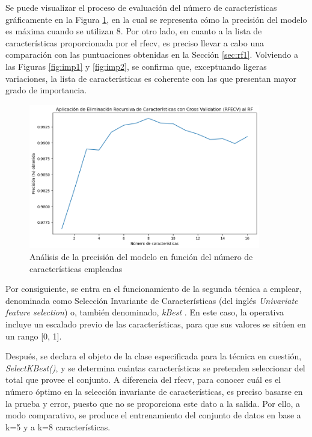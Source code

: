 \vspace{3mm}

Se puede visualizar el proceso de evaluación del número de características gráficamente en la Figura \ref{fig:rfecv}, en la cual se representa cómo la precisión del modelo es máxima cuando se utilizan 8. Por otro lado, en cuanto a la lista de características proporcionada por el \gls{rfecv}, es preciso llevar a cabo una comparación con las puntuaciones obtenidas en la Sección \ref{sec:rf1}. Volviendo a las Figuras \ref{fig:imp1} y \ref{fig:imp2}, se confirma que, exceptuando ligeras variaciones, la lista de características es coherente con las que presentan mayor grado de importancia.

\vspace{3mm}

\begin{figure}[H]
  \centering
  \includegraphics[width=0.9\textwidth]{img/desarrollo/rf/rfecv.png}
  \caption{Análisis de la precisión del modelo en función del número de características empleadas}
  \label{fig:rfecv}
\end{figure}

Por consiguiente, se entra en el funcionamiento de la segunda técnica a emplear, denominada como Selección Invariante de Características (del inglés \textit{Univariate feature selection}) o, también denominado, \textit{kBest} \cite{kbest}. En este caso, la operativa incluye un escalado previo de las características, para que sus valores se sitúen en un rango [0, 1]. 

\vspace{3mm}

Después, se declara el objeto de la clase especificada para la técnica en cuestión, \textit{SelectKBest()}, y se determina cuántas características se pretenden seleccionar del total que provee el conjunto. A diferencia del \gls{rfecv}, para conocer cuál es el número óptimo en la selección invariante de características, es preciso basarse en la prueba y error, puesto que no se proporciona este dato a la salida. Por ello, a modo comparativo, se produce el entrenamiento del conjunto de datos en base a k=5 y a k=8 características. 

